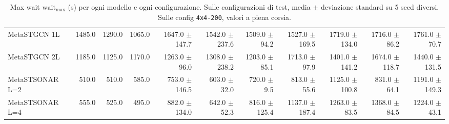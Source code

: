 \begin{table}
\begin{tabular}{@{}lrrrrrrrrrr@{}}
    MetaSTGCN 1L              & 1485.0  & 1290.0  & 1065.0  & 1647.0 {\fontsize{4}{4}\selectfont$\pm$147.7}   & 1542.0 {\fontsize{4}{4}\selectfont$\pm$237.6} & 1509.0 {\fontsize{4}{4}\selectfont$\pm$94.2}  & 1527.0 {\fontsize{4}{4}\selectfont$\pm$169.5}   & 1719.0 {\fontsize{4}{4}\selectfont$\pm$134.0}   & 1716.0 {\fontsize{4}{4}\selectfont$\pm$86.2}   & 1761.0 {\fontsize{4}{4}\selectfont$\pm$70.7}   \\
    MetaSTGCN 2L              & 1185.0  & 1125.0  & 1170.0  & 1263.0 {\fontsize{4}{4}\selectfont$\pm$96.0}   & 1308.0 {\fontsize{4}{4}\selectfont$\pm$238.2} & 1203.0 {\fontsize{4}{4}\selectfont$\pm$85.1}  & 1713.0 {\fontsize{4}{4}\selectfont$\pm$97.9}   & 1401.0 {\fontsize{4}{4}\selectfont$\pm$141.2}   & 1674.0 {\fontsize{4}{4}\selectfont$\pm$118.7}   & 1440.0 {\fontsize{4}{4}\selectfont$\pm$131.5}   \\
    MetaSTSONAR L=2           & 510.0   & 510.0   & 585.0   & 753.0 {\fontsize{4}{4}\selectfont$\pm$146.5}    & 603.0 {\fontsize{4}{4}\selectfont$\pm$32.0}   & 720.0 {\fontsize{4}{4}\selectfont$\pm$9.5}    & 813.0 {\fontsize{4}{4}\selectfont$\pm$55.6}    & 1125.0 {\fontsize{4}{4}\selectfont$\pm$100.8}   & 831.0 {\fontsize{4}{4}\selectfont$\pm$64.1}    & 1191.0 {\fontsize{4}{4}\selectfont$\pm$149.3}   \\
    MetaSTSONAR L=4           & 555.0   & 525.0   & 495.0   & 882.0 {\fontsize{4}{4}\selectfont$\pm$134.0}   & 642.0 {\fontsize{4}{4}\selectfont$\pm$52.3}   & 816.0 {\fontsize{4}{4}\selectfont$\pm$125.4}  & 1137.0 {\fontsize{4}{4}\selectfont$\pm$187.4}   & 1263.0 {\fontsize{4}{4}\selectfont$\pm$83.5}   & 1368.0 {\fontsize{4}{4}\selectfont$\pm$84.5}   & 1224.0 {\fontsize{4}{4}\selectfont$\pm$43.1}   \\
    \bottomrule
  \end{tabular}
  \caption{Max wait $\text{wait}_{\max}$ (s) per ogni modello e ogni configurazione. Sulle configurazioni di test, media $\pm$ deviazione standard su 5 seed diversi. Sulle config \texttt{4x4-200}, valori a piena corsia.}
  \label{tab:wait-full}
\end{table}
